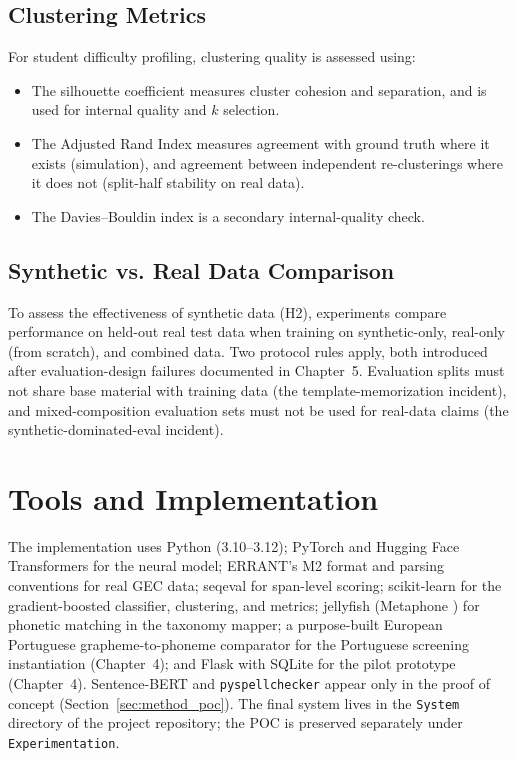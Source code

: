 \subsection{Clustering Metrics}
\label{sec:method_eval_cluster}

For student difficulty profiling, clustering quality is assessed using:
\begin{itemize}
    \item The silhouette coefficient \parencite{Rousseeuw1987} measures cluster cohesion and separation, and is used for internal quality and $k$ selection.
    \item The Adjusted Rand Index \parencite{HubertArabie1985} measures agreement with ground truth where it exists (simulation), and agreement between independent re-clusterings where it does not (split-half stability on real data).
    \item The Davies--Bouldin index \parencite{DaviesBouldin1979} is a secondary internal-quality check.
\end{itemize}

\subsection{Synthetic vs. Real Data Comparison}
\label{sec:method_eval_synth}

To assess the effectiveness of synthetic data (H2), experiments compare performance on held-out real test data when training on synthetic-only, real-only (from scratch), and combined data. Two protocol rules apply, both introduced after evaluation-design failures documented in Chapter~5. Evaluation splits must not share base material with training data (the template-memorization incident), and mixed-composition evaluation sets must not be used for real-data claims (the synthetic-dominated-eval incident).

\section{Tools and Implementation}
\label{sec:method_tools}

The implementation uses Python (3.10--3.12); PyTorch and Hugging Face Transformers for the neural model; ERRANT's M2 format and parsing conventions \parencite{BryantFeliceBriscoe2017} for real GEC data; seqeval for span-level scoring; scikit-learn \parencite{Pedregosa2011} for the gradient-boosted classifier, clustering, and metrics; jellyfish (Metaphone \parencite{Philips1990}) for phonetic matching in the taxonomy mapper; a purpose-built European Portuguese grapheme-to-phoneme comparator for the Portuguese screening instantiation (Chapter~4); and Flask with SQLite for the pilot prototype (Chapter~4). Sentence-BERT and \texttt{pyspellchecker} appear only in the proof of concept (Section~\ref{sec:method_poc}). The final system lives in the \texttt{System} directory of the project repository; the POC is preserved separately under \texttt{Experimentation}.

